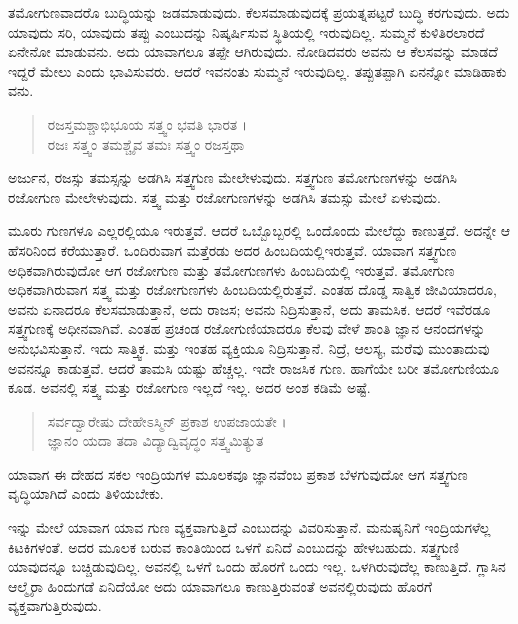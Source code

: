 ತಮೋಗುಣವಾದರೊ ಬುದ್ಧಿಯನ್ನು ಜಡಮಾಡುವುದು. ಕೆಲಸಮಾಡುವುದಕ್ಕೆ ಪ್ರಯತ್ನಪಟ್ಟರೆ ಬುದ್ಧಿ ಕರಗುವುದು. ಅದು ಯಾವುದು ಸರಿ, ಯಾವುದು ತಪ್ಪು ಎಂಬುದನ್ನು ನಿಷ್ಕರ್ಷಿಸುವ ಸ್ಥಿತಿಯಲ್ಲಿ ಇರುವುದಿಲ್ಲ. ಸುಮ್ಮನೆ ಕುಳಿತಿರಲಾರದೆ ಏನೇನೋ ಮಾಡುವನು. ಅದು ಯಾವಾಗಲೂ ತಪ್ಪೇ ಆಗಿರುವುದು. ನೋಡಿದವರು ಅವನು ಆ ಕೆಲಸವನ್ನು ಮಾಡದೆ ಇದ್ದರೆ ಮೇಲು ಎಂದು ಭಾವಿಸುವರು. ಆದರೆ ಇವನಂತು ಸುಮ್ಮನೆ ಇರುವುದಿಲ್ಲ. ತಪ್ಪುತಪ್ಪಾಗಿ ಏನನ್ನೋ ಮಾಡಿಹಾಕು ವನು.

\begin{verse}
ರಜಸ್ತಮಶ್ಚಾಭಿಭೂಯ ಸತ್ತ್ವಂ ಭವತಿ ಭಾರತ ।\\ರಜಃ ಸತ್ತ್ವಂ ತಮಶ್ಚೈವ ತಮಃ ಸತ್ತ್ವಂ ರಜಸ್ತಥಾ 
\end{verse}

{\small ಅರ್ಜುನ, ರಜಸ್ಸು ತಮಸ್ಸನ್ನು ಅಡಗಿಸಿ ಸತ್ತ್ವಗುಣ ಮೇಲೇಳುವುದು. ಸತ್ತ್ವಗುಣ ತಮೋಗುಣಗಳನ್ನು ಅಡಗಿಸಿ ರಜೋಗುಣ ಮೇಲೇಳುವುದು. ಸತ್ತ್ವ ಮತ್ತು ರಜೋಗುಣಗಳನ್ನು ಅಡಗಿಸಿ ತಮಸ್ಸು ಮೇಲೆ ಏಳುವುದು.}

ಮೂರು ಗುಣಗಳೂ ಎಲ್ಲರಲ್ಲಿಯೂ ಇರುತ್ತವೆ. ಆದರೆ ಒಬ್ಬೊಬ್ಬರಲ್ಲಿ ಒಂದೊಂದು ಮೇಲೆದ್ದು ಕಾಣುತ್ತದೆ. ಅದನ್ನೇ ಆ ಹೆಸರಿನಿಂದ ಕರೆಯುತ್ತಾರೆ. ಒಂದಿರುವಾಗ ಮತ್ತೆರಡು ಅದರ ಹಿಂಬದಿಯಲ್ಲಿಇರುತ್ತವೆ. ಯಾವಾಗ ಸತ್ತ್ವಗುಣ ಅಧಿಕವಾಗಿರುವುದೋ ಆಗ ರಜೋಗುಣ ಮತ್ತು ತಮೋಗುಣಗಳು ಹಿಂಬದಿಯಲ್ಲಿ ಇರುತ್ತವೆ. ತಮೋಗುಣ ಅಧಿಕವಾಗಿರುವಾಗ ಸತ್ತ್ವ ಮತ್ತು ರಜೋಗುಣಗಳು ಹಿಂಬದಿಯಲ್ಲಿರುತ್ತವೆ. ಎಂತಹ ದೊಡ್ಡ ಸಾತ್ವಿಕ ಜೀವಿಯಾದರೂ, ಅವನು ಏನಾದರೂ ಕೆಲಸಮಾಡುತ್ತಾನೆ, ಅದು ರಾಜಸ; ಅವನು ನಿದ್ರಿಸುತ್ತಾನೆ, ಅದು ತಾಮಸಿಕ. ಆದರೆ ಇವೆರಡೂ ಸತ್ತ್ವಗುಣಕ್ಕೆ ಅಧೀನವಾಗಿವೆ. ಎಂತಹ ಪ್ರಚಂಡ ರಜೋಗುಣಿಯಾದರೂ ಕೆಲವು ವೇಳೆ ಶಾಂತಿ ಜ್ಞಾನ ಆನಂದಗಳನ್ನು ಅನುಭವಿಸುತ್ತಾನೆ. ಇದು ಸಾತ್ತ್ವಿಕ. ಮತ್ತು ಇಂತಹ ವ್ಯಕ್ತಿಯೂ ನಿದ್ರಿಸುತ್ತಾನೆ. ನಿದ್ರೆ, ಆಲಸ್ಯ, ಮರೆವು ಮುಂತಾದುವು ಅವನನ್ನೂ ಕಾಡುತ್ತವೆ. ಆದರೆ ತಾಮಸಿ ಯಷ್ಟು ಹೆಚ್ಚಲ್ಲ. ಇದೇ ರಾಜಸಿಕ ಗುಣ. ಹಾಗೆಯೇ ಬರೀ ತಮೋಗುಣಿಯೂ ಕೂಡ. ಅವನಲ್ಲಿ ಸತ್ತ್ವ ಮತ್ತು ರಜೋಗುಣ ಇಲ್ಲದೆ ಇಲ್ಲ. ಅದರ ಅಂಶ ಕಡಿಮೆ ಅಷ್ಟೆ.

\begin{verse}
ಸರ್ವದ್ವಾರೇಷು ದೇಹೇಽಸ್ಮಿನ್ ಪ್ರಕಾಶ ಉಪಜಾಯತೇ ।\\ಜ್ಞಾನಂ ಯದಾ ತದಾ ವಿದ್ಯಾದ್ವಿವೃದ್ಧಂ ಸತ್ತ್ವಮಿತ್ಯುತ 
\end{verse}

{\small ಯಾವಾಗ ಈ ದೇಹದ ಸಕಲ ಇಂದ್ರಿಯಗಳ ಮೂಲಕವೂ ಜ್ಞಾನವೆಂಬ ಪ್ರಕಾಶ ಬೆಳಗುವುದೋ ಆಗ ಸತ್ತ್ವಗುಣ ವೃದ್ಧಿಯಾಗಿದೆ ಎಂದು ತಿಳಿಯಬೇಕು.}

ಇನ್ನು ಮೇಲೆ ಯಾವಾಗ ಯಾವ ಗುಣ ವ್ಯಕ್ತವಾಗುತ್ತಿದೆ ಎಂಬುದನ್ನು ವಿವರಿಸುತ್ತಾನೆ. ಮನುಷೃನಿಗೆ ಇಂದ್ರಿಯಗಳೆಲ್ಲ ಕಿಟಕಿಗಳಂತೆ. ಅದರ ಮೂಲಕ ಬರುವ ಕಾಂತಿಯಿಂದ ಒಳಗೆ ಏನಿದೆ ಎಂಬುದನ್ನು ಹೇಳಬಹುದು. ಸತ್ತ್ವಗುಣಿ ಯಾವುದನ್ನೂ ಬಚ್ಚಿಡುವುದಿಲ್ಲ. ಅವನಲ್ಲಿ ಒಳಗೆ ಒಂದು ಹೊರಗೆ ಒಂದು ಇಲ್ಲ. ಒಳಗಿರುವುದೆಲ್ಲ ಕಾಣುತ್ತಿದೆ. ಗ್ಲಾಸಿನ ಆಲ್ಮೈರಾ ಹಿಂದುಗಡೆ ಏನಿದೆಯೋ ಅದು ಯಾವಾಗಲೂ ಕಾಣುತ್ತಿರುವಂತೆ ಅವನಲ್ಲಿರುವುದು ಹೊರಗೆ ವ್ಯಕ್ತವಾಗುತ್ತಿರುವುದು.

